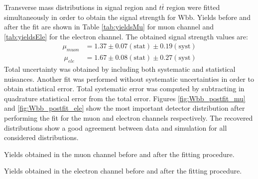 Transverse mass distributions in signal region and $t\bar{t}$ region were fitted simultaneously in order to obtain the signal strength for Wbb. Yields before and after the fit are shown in Table \ref{tab:yieldsMu} for muon channel and \ref{tab:yieldsEle} for the electron channel. The obtained signal strength values are:
\begin{align*}
\mu_{muon} &= 1.37 \pm 0.07\mathrm{(stat)} \pm 0.19 \mathrm{(syst)}\\\
\mu_{ele} &= 1.67 \pm 0.08\mathrm{(stat)} \pm 0.27\mathrm{(syst)}
\end{align*}
Total uncertainty was obtained by including both systematic and statistical nuisances. Another fit was performed without systematic uncertainties in order to obtain statistical error. Total systematic error was computed by subtracting in quadrature statistical error from the total error. 
Figures \ref{fig:Wbb_postfit_mu} and \ref{fig:Wbb_postfit_ele} show the most important detector distribution after performing the fit for the muon and electron channels respectively. The recovered distributions show a good agreement between data and simulation for all considered distributions.

\begin{table}[h!]
\caption{Yields obtained in the muon channel before and after the fitting procedure.}
\label{tab:yieldsMu}

\end{table}
\begin{table}[h!]
\caption{Yields obtained in the electron channel before and after the fitting procedure.}
\label{tab:yieldsEle}

\end{table}

